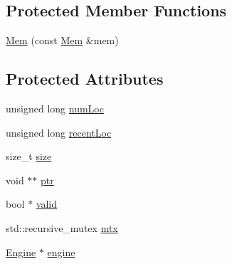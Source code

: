\subsection*{Protected Member Functions}
\begin{DoxyCompactItemize}
\item 
\hyperlink{classfractal_1_1Mem_a08cbccf1b08c274c0e8e159591f2dd6b}{Mem} (const \hyperlink{classfractal_1_1Mem}{Mem} \&mem)
\end{DoxyCompactItemize}
\subsection*{Protected Attributes}
\begin{DoxyCompactItemize}
\item 
unsigned long \hyperlink{classfractal_1_1Mem_af439baa77e71a82ed3af0c4008a2acab}{num\+Loc}
\item 
unsigned long \hyperlink{classfractal_1_1Mem_a88ed47770d54303686603e4c16e959bb}{recent\+Loc}
\item 
size\+\_\+t \hyperlink{classfractal_1_1Mem_a4bddc66ce0aa9b7a58418645f840f537}{size}
\item 
void $\ast$$\ast$ \hyperlink{classfractal_1_1Mem_ae58554129a5f44942fe556518d97251e}{ptr}
\item 
bool $\ast$ \hyperlink{classfractal_1_1Mem_a1042b8d79e8e6e141aac6c0ddf6677d3}{valid}
\item 
std\+::recursive\+\_\+mutex \hyperlink{classfractal_1_1Mem_aa30c383915eb0b8987746c11b45fa807}{mtx}
\item 
\hyperlink{classfractal_1_1Engine}{Engine} $\ast$ \hyperlink{classfractal_1_1Mem_a36371a8e475f1aad6df2fc0243c0db58}{engine}
\end{DoxyCompactItemize}


